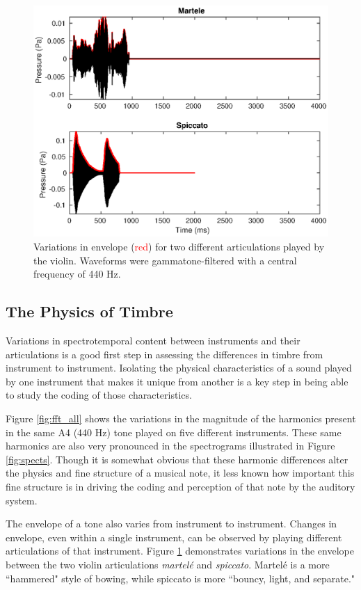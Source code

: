 \documentclass[conference]{IEEEtran}
\begin{document}
\begin{figure}[h!]
\includegraphics[width = .5\textwidth]{martele_spiccato_compare}
\caption{Variations in envelope (\textcolor{red}{red}) for two different articulations played by the violin. Waveforms were gammatone-filtered with a central frequency of 440 Hz.}
\label{fig:articulation}
\end{figure}

\subsection{The Physics of Timbre}
Variations in spectrotemporal content between instruments and their articulations is a good first step in assessing the differences in timbre from instrument to instrument. Isolating the physical characteristics of a sound played by one instrument that makes it unique from another is a key step in being able to study the coding of those characteristics. 

Figure \ref{fig:fft_all} shows the variations in the magnitude of the harmonics present in the same A4 (440 Hz) tone played on five different instruments. These same harmonics are also very pronounced in the spectrograms illustrated in Figure \ref{fig:spects}. Though it is somewhat obvious that these harmonic differences alter the physics and fine structure of a musical note, it less known how important this fine structure is in driving the coding and perception of that note by the auditory system.



The envelope of a tone also varies from instrument to instrument. Changes in envelope, even within a single instrument, can be observed by playing different articulations of that instrument. Figure \ref{fig:articulation} demonstrates variations in the envelope between the two violin articulations \textit{martel\'{e}} and \textit{spiccato}. Martel\'{e} is a more ``hammered" style of bowing, while spiccato is more ``bouncy, light, and separate."
\end{document}
